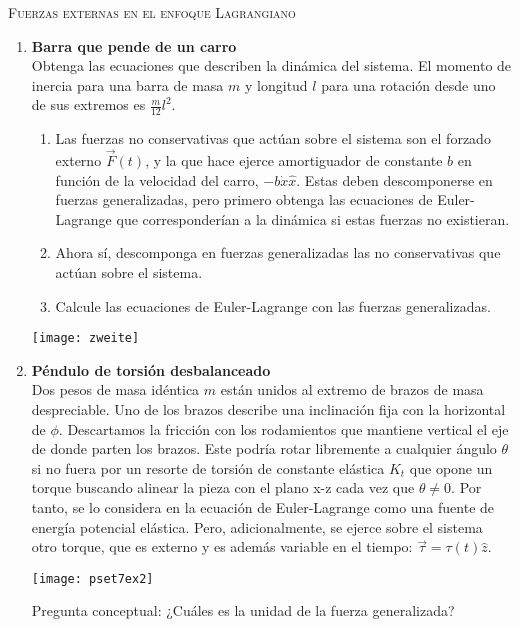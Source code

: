 \documentclass[11pt, spanish, a4paper, twoside]{article}
\begin{document}
\begin{center}
  \textsc{\large Fuerzas externas en el enfoque Lagrangiano}
\end{center}

\begin{enumerate}

\item 
\begin{minipage}[t][8cm]{0.55\textwidth} 
\textbf{Barra que pende de un carro}\\
Obtenga las ecuaciones que describen la dinámica del sistema.
El momento de inercia para una barra de masa \(m\) y longitud \(l\) para una rotación desde uno de sus extremos es \(\frac{m}{12} l^2\). 
\begin{enumerate}
	\item Las fuerzas no conservativas que actúan sobre el sistema son el forzado externo \(\vec{F}(t)\), y la que hace ejerce amortiguador de constante \(b\) en función de la velocidad del carro,  \(- b \dot{x} \hat{x}\).
	Estas deben descomponerse en fuerzas generalizadas, pero primero obtenga las ecuaciones de Euler-Lagrange que corresponderían a la dinámica si estas fuerzas no existieran.
	\item Ahora sí, descomponga en fuerzas generalizadas las no conservativas que actúan sobre el sistema.
	\item Calcule las ecuaciones de Euler-Lagrange con las fuerzas generalizadas.
\end{enumerate}
\end{minipage}
\begin{minipage}[c][-1cm][t]{0.4\textwidth}
	\texttt{[image: zweite]}
\end{minipage}



\item 
\begin{minipage}[t][5.3cm]{0.6\textwidth}
\textbf{Péndulo de torsión desbalanceado}\\
Dos pesos de masa idéntica $m$ están unidos al extremo de brazos de masa despreciable.
Uno de los brazos describe una inclinación fija con la horizontal de $\phi$.
Descartamos la fricción con los rodamientos que mantiene vertical el eje de donde parten los brazos.
Este podría rotar libremente a cualquier ángulo $\theta$ si no fuera por un resorte de torsión de constante elástica $K_t$ que opone un torque buscando alinear la pieza con el plano x-z cada vez que $\theta \neq 0$.
Por tanto, se lo considera en la ecuación de Euler-Lagrange como una fuente de energía potencial elástica.
Pero, adicionalmente, se ejerce sobre el sistema otro torque, que es externo y es además variable en el tiempo: $\vec{\tau}= \tau (t) \hat{z}$.
\end{minipage}
\begin{minipage}[c][0cm][t]{0.35\textwidth}
	\texttt{[image: pset7ex2]}
\end{minipage}
Pregunta conceptual:
¿Cuáles es la unidad de la fuerza generalizada?


\end{enumerate}
\end{document}
